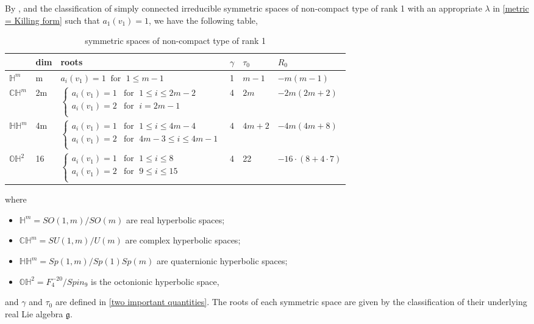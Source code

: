 \documentclass[12pt]{amsart}
\begin{document}
By ,  and the classification of simply connected irreducible symmetric spaces of non-compact type of rank 1 with an appropriate $\lambda$ in \eqref{metric = Killing form} such that $a_1(v_1) = 1$, we have the following table, 
\begin{table}[htbp]
\begin{tabular}{|l|l|l|l|l|l|}
\hline
& dim & roots & $\gamma$ & $\tau_0$ & $R_0$ \\ \hline
        $\mathbb{H}^m$ & m & $a_i(v_1) = 1\;\; \text{for }\; 1\leq m - 1$ & 1 & $m - 1$ & $-m(m - 1)$ \\ \hline
        $\mathbb{C}\mathbb{H}^m$ & 2m & $\begin{cases}
            a_i(v_1) = 1 & \text{for }\; 1\leq i \leq 2m - 2\\
            a_i(v_1) = 2 & \text{for }\; i = 2m - 1\\
        \end{cases}$ & 4 & $2m$ & $-2m(2m + 2)$ \\ \hline
        $\mathbb{H}\mathbb{H}^m$ & 4m & $\begin{cases}
            a_i(v_1) = 1 & \text{for }\; 1\leq i\leq 4m - 4\\
            a_i(v_1) = 2 & \text{for }\; 4m - 3\leq i \leq 4m - 1\\
        \end{cases}$ & $4$ & $4m + 2$ & $-4m(4m + 8)$ \\ \hline
        $\mathbb{O}\mathbb{H}^2 $ & 16 & $\begin{cases}
            a_i(v_1) = 1 & \text{for }\; 1\leq i\leq 8\\
            a_i(v_1) = 2 & \text{for }\; 9\leq i \leq 15\\
        \end{cases}$ & 4 & 22 & $-16\cdot (8 + 4\cdot 7)$  \\ \hline
\end{tabular}
\caption{symmetric spaces of non-compact type of rank 1}
\label{symmetric spaces of non-compact type of rank 1}
\end{table}
where 
\begin{itemize}
    \item $\mathbb{H}^m = SO(1, m)/SO(m)$ are real hyperbolic spaces;  
    \item $\mathbb{C}\mathbb{H}^m = SU(1, m)/U(m)$ are complex hyperbolic spaces;
    \item $\mathbb{H}\mathbb{H}^m = Sp(1, m)/Sp(1)Sp(m)$  are quaternionic hyperbolic spaces;
    \item $\mathbb{O}\mathbb{H}^2 = F^{-20}_4/Spin_9$ is the octonionic hyperbolic space,
\end{itemize}
and $\gamma$ and $\tau_0$ are defined in \eqref{two important quantities}. The roots of each symmetric space are given by the classification of their underlying real Lie algebra $\mathfrak{g}$.
\end{document}
